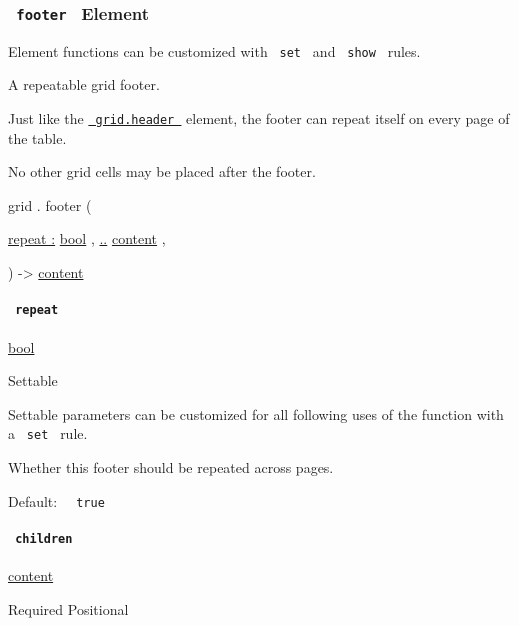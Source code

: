 \subsubsection{\texorpdfstring{\texttt{\ footer\ } {{ Element
}}}{ footer   Element }}\label{definitions-footer}

\label{definitions-footer-element-tooltip}
Element functions can be customized with \texttt{\ set\ } and
\texttt{\ show\ } rules.

A repeatable grid footer.

Just like the
\href{/docs/reference/layout/grid/\#definitions-header}{\texttt{\ grid.header\ }}
element, the footer can repeat itself on every page of the table.

No other grid cells may be placed after the footer.

grid { . } { footer } (

{ \hyperref[definitions-footer-parameters-repeat]{repeat :}
\href{/docs/reference/foundations/bool/}{bool} , } {
\hyperref[definitions-footer-parameters-children]{..}
\href{/docs/reference/foundations/content/}{content} , }

) -\textgreater{} \href{/docs/reference/foundations/content/}{content}

\paragraph{\texorpdfstring{\texttt{\ repeat\ }}{ repeat }}\label{definitions-footer-repeat}

\href{/docs/reference/foundations/bool/}{bool}

{{ Settable }}

\label{definitions-footer-repeat-settable-tooltip}
Settable parameters can be customized for all following uses of the
function with a \texttt{\ set\ } rule.

Whether this footer should be repeated across pages.

Default: \texttt{\ }{\texttt{\ true\ }}\texttt{\ }

\paragraph{\texorpdfstring{\texttt{\ children\ }}{ children }}\label{definitions-footer-children}

\href{/docs/reference/foundations/content/}{content}

{Required} {{ Positional }}

